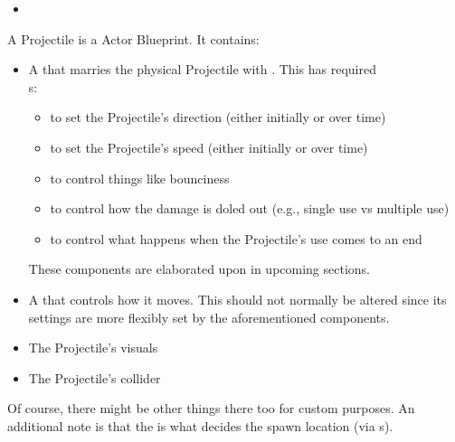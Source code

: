 

\begin{tldr}
	\begin{itemize}
		\item{}
	\end{itemize}
\end{tldr}

\localtoc



A Projectile is a Actor Blueprint. It contains:
\begin{itemize}
	\item{A  that marries the physical Projectile with . This has required\\s:
		\begin{itemize}
			\item{ to set the Projectile's direction (either initially or over time)}
			\item{ to set the Projectile's speed (either initially or over time)}
			\item{ to control things like bounciness}
			\item{ to control how the damage is doled out (e.g., single use vs multiple use)}
			\item{ to control what happens when the Projectile's use comes to an end}
		\end{itemize}
		These components are elaborated upon in upcoming sections.
	}
	\item{A  that controls how it moves. This should not normally be altered since its settings are more flexibly set by the aforementioned components.}
	\item{The Projectile's visuals}
	\item{The Projectile's collider}
\end{itemize}
\noindent Of course, there might be other things there too for custom purposes. An additional note is that the  is what decides the spawn location (via s).



\postamble{}